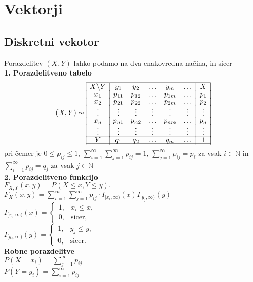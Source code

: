 \section{Vektorji}

\subsection{Diskretni vekotor}
Porazdelitev $(X,Y)$ lahko podamo na dva enakovredna načina, in sicer\\
\textbf{1. Porazdelitveno tabelo}
$$(X,Y)\sim\begin{array}{|c|ccccc|c|}
\hline X\backslash Y& y_1	& y_2 & \ldots & y_m& \ldots& X	\\[-2pt]\hline
x_1	&     p_{11}& p_{12}& \ldots & p_{1m}& \ldots&p_1\\[-2pt]
x_2	&     p_{21}& p_{22}& \ldots & p_{2m}& \ldots&p_2\\[-2pt]
\vdots & 	\vdots   & \vdots & \vdots & \vdots & \vdots&\vdots \\[-2pt]
x_n	&     p_{n1}&   p_{n2}&  \ldots & p_{nm} & \ldots&p_n\\[-2pt]
\vdots & 	\vdots   & \vdots & \vdots & \vdots & \vdots&\vdots \\[-2pt]
\hline
Y & q_1 & q_2 & \ldots & q_m &\ldots& 1\\[-2pt] 
\hline
\end{array}$$
pri čemer je
$0\!\leq\!p_{ij}\!\leq\!1$, 
$\displaystyle\sum_{i=1}^{\infty}\sum_{j=1}^{\infty} p_{ij}\!=\!1$,
$\displaystyle\sum_{j=1}^\infty p_{ij}=p_i$ za vsak $i\in \mathbb{N}$
in 
$\displaystyle\sum_{i=1}^\infty p_{ij}=q_j$ za vsak $j\in \mathbb{N}$\\
\textbf{2. Porazdelitveno funkcijo} \\
$F_{X,Y}(x,y) = P(X\!\leq\!x, Y\!\leq\!y).$\\
$\displaystyle F_X(x,y) = \sum_{i=1}^{\infty}\sum_{j=1}^{\infty} p_{ij} \cdot I_{[x_i,\infty)}(x) I_{[y_j,\infty)}(y)$\\
$I_{[x_i,\infty)}(x)=\left\{\begin{array}{ll}1, & x_i\leq x, \\ 0, & \text{sicer,}\end{array}\right.\quad$\\
$I_{[y_j,\infty)}(y)=\left\{\begin{array}{ll}1, & y_j\leq y, \\ 0, & \text{sicer.}\end{array}\right.$\\
\textbf{Robne porazdelitve}\\
$P(X=x_i)=\sum\limits_{j=1}^\infty p_{ij}$\\
$P(Y=y_i)=\sum\limits_{i=1}^\infty p_{ij}$\\





